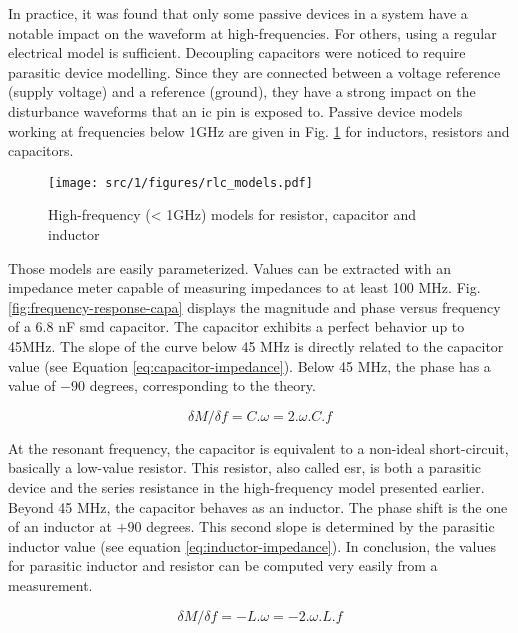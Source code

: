 In practice, it was found that only some passive devices in a system have a notable impact on the waveform at high-frequencies.
For others, using a regular electrical model is sufficient.
Decoupling capacitors were noticed to require parasitic device modelling.
Since they are connected between a voltage reference (supply voltage) and a reference (ground), they have a strong impact on the disturbance waveforms that an \gls{ic} pin is exposed to.
Passive device models working at frequencies below 1GHz are given in Fig. \ref{fig:rlc-esd-models} for inductors, resistors and capacitors.

\begin{figure}[!h]
  \centering
  \texttt{[image: src/1/figures/rlc\_models.pdf]}
  \caption{High-frequency (< 1GHz) models for resistor, capacitor and inductor}
  \label{fig:rlc-esd-models}
\end{figure}

Those models are easily parameterized.
Values can be extracted with an impedance meter capable of measuring impedances to at least 100 MHz.
Fig. \ref{fig:frequency-response-capa} displays the magnitude and phase versus frequency of a 6.8 nF \gls{smd} capacitor.
The capacitor exhibits a perfect behavior up to 45MHz.
The slope of the curve below 45 MHz is directly related to the capacitor value (see Equation \ref{eq:capacitor-impedance}).
Below 45 MHz, the phase has a value of $-90$ degrees, corresponding to the theory.

\begin{equation}
\delta M/ \delta f = C. \omega = 2.\omega .C.f
\label{eq:capacitor-impedance}
\end{equation}

At the resonant frequency, the capacitor is equivalent to a non-ideal short-circuit, basically a low-value resistor.
This resistor, also called \gls{esr}, is both a parasitic device and the series resistance in the high-frequency model presented earlier.
Beyond 45 MHz, the capacitor behaves as an inductor.
The phase shift is the one of an inductor at $+90$ degrees.
This second slope is determined by the parasitic inductor value (see equation \ref{eq:inductor-impedance}).
In conclusion, the values for parasitic inductor and resistor can be computed very easily from a measurement.

\begin{equation}
\delta M/ \delta f =  -L.\omega = -2.\omega .L.f
\label{eq:inductor-impedance}
\end{equation}

